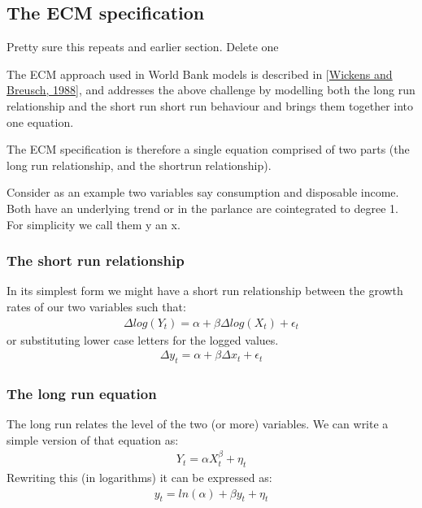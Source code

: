 \documentclass[letterpaper,10pt,english]{jupyterBook}
\begin{document}
\subsection{The ECM specification}
\label{\detokenize{content/05_WBModels/LoadingWBModel:the-ecm-specification}}
\sphinxAtStartPar
 Pretty sure this repeats and earlier section.  Delete one 

\sphinxAtStartPar
The ECM approach used in World Bank models is described in {[}\hyperlink{cite.content/99_BackMatter/References:id16}{Wickens and Breusch, 1988}{]}, and addresses the above challenge by modelling both the long run relationship and the short run short run behaviour and brings them together into one equation.

\sphinxAtStartPar
The ECM specification is therefore a single equation comprised of two parts (the long run relationship, and the short\sphinxhyphen{}run relationship).

\sphinxAtStartPar
Consider as an example two variables say consumption and disposable income.  Both have an underlying trend or in the parlance are co\sphinxhyphen{}integrated to degree 1.  For simplicity we call them y an x.


\subsubsection{The short run relationship}
\label{\detokenize{content/05_WBModels/LoadingWBModel:the-short-run-relationship}}
\sphinxAtStartPar
In its simplest form we might have a short run relationship between the growth rates of our two variables such that:
\begin{equation*}
\begin{split}\Delta log(Y_t) = \alpha + \beta \Delta log(X_t) +\epsilon_t\end{split}
\end{equation*}
\sphinxAtStartPar
or substituting lower case letters for the logged values.
\begin{equation*}
\begin{split}\Delta y_t = \alpha + \beta \Delta x_t +\epsilon_t\end{split}
\end{equation*}

\subsubsection{The long run equation}
\label{\detokenize{content/05_WBModels/LoadingWBModel:the-long-run-equation}}
\sphinxAtStartPar
The long run relates the level of the two (or more) variables.  We can write a simple version of that equation as:
\begin{equation*}
\begin{split}Y_t=αX_t^β+ \eta_t\end{split}
\end{equation*}
\sphinxAtStartPar
Rewriting this (in logarithms) it can be expressed as:
\begin{equation*}
\begin{split}y_t = ln⁡(α) + βy_t + \eta_t\end{split}
\end{equation*}
\end{document}

